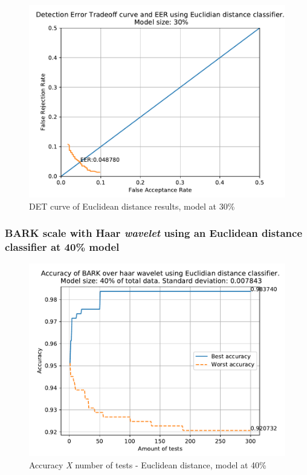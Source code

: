 			\begin{figure}[ht]
				\centering
				\includegraphics[scale=.6]{images/results/det/DET_for_classifier_Euclidian_30}
				\caption{DET curve of Euclidean distance results, model at 30\%}
				\label{fig:detforclassifiereuclidian30}
			\end{figure}
		
			
		
		\subsubsection{BARK scale with Haar \textit{wavelet} using an Euclidean distance classifier at 40\% model}
		
			\begin{figure}[H]
				\centering
				\includegraphics[scale=.6]{images/results/confusionMatrices/classifier_Euclidian_40}
				\caption{Accuracy \textit{X} number of tests - Euclidean distance, model at 40\%}
				\label{fig:classifiereuclidian40}
			\end{figure}
			
